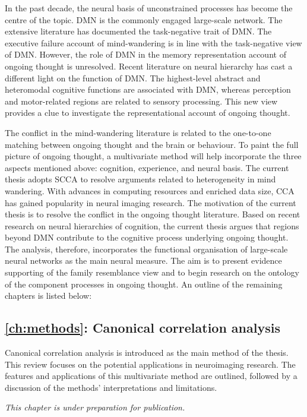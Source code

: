 In the past decade, the neural basis of unconstrained processes has become the centre of the topic. DMN is the commonly engaged large-scale network. The extensive literature has documented the task-negative trait of DMN. The executive failure account of mind-wandering is in line with the task-negative view of DMN. However, the role of DMN in the memory representation account of ongoing thought is unresolved. Recent literature on neural hierarchy has cast a different light on the function of DMN. The highest-level abstract and heteromodal cognitive functions are associated with DMN, whereas perception and motor-related regions are related to sensory processing. This new view provides a clue to investigate the representational account of ongoing thought.

The conflict in the mind-wandering literature is related to the one-to-one matching between ongoing thought and the brain or behaviour. To paint the full picture of ongoing thought, a multivariate method will help incorporate the three aspects mentioned above: cognition, experience, and neural basis. The current thesis adopts SCCA to resolve arguments related to heterogeneity in mind wandering. With advances in computing resources and enriched data size, CCA has gained popularity in neural imaging research. The motivation of the current thesis is to resolve the conflict in the ongoing thought literature. Based on recent research on neural hierarchies of cognition, the current thesis argues that regions beyond DMN contribute to the cognitive process underlying ongoing thought. The analysis, therefore, incorporates the functional organisation of large-scale neural networks as the main neural measure. The aim is to present evidence supporting of the family resemblance view and to begin research on the ontology of the component processes in ongoing thought. An outline of the remaining chapters is listed below:

\subsection*{\cref{ch:methods}: Canonical correlation analysis}

Canonical correlation analysis is introduced as the main method of the thesis. This review focuses on the potential applications in neuroimaging research. The features and applications of this multivariate method are outlined, followed by a discussion of the methods' interpretations and limitations. 

\textit{This chapter is under preparation for publication. } 

